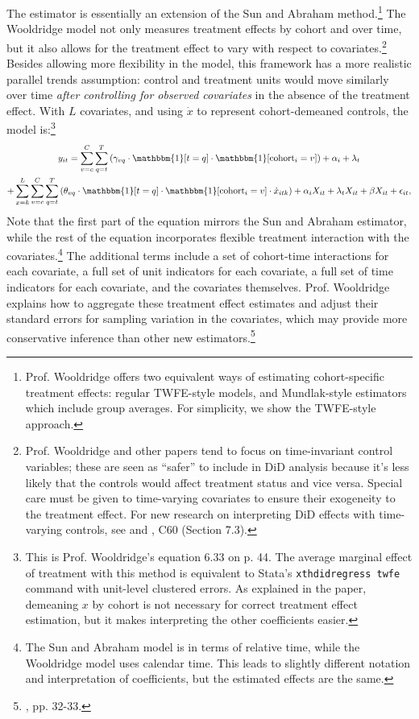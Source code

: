 \documentclass[12pt]{article}
\begin{document}
The \citet{wooldridge2021two} estimator is essentially an extension of the Sun and Abraham method.\footnote{Prof. Wooldridge offers two equivalent ways of estimating cohort-specific treatment effects: regular TWFE-style models, and Mundlak-style estimators which include group averages. For simplicity, we show the TWFE-style approach.}  The Wooldridge model not only measures treatment effects by cohort and over time, but it also allows for the treatment effect to vary with respect to covariates.\footnote{Prof. Wooldridge and other papers tend to focus on time-invariant control variables; these are seen as “safer” to include in DiD analysis because it’s less likely that the controls would affect treatment status and vice versa. Special care must be given to time-varying covariates to ensure their exogeneity to the treatment effect. For new research on interpreting DiD effects with time-varying controls, see \citet{caetano2023} and \citet{wooldridge2023nonlinear}, C60 (Section 7.3).} Besides allowing more flexibility in the model, this framework has a more realistic parallel trends assumption: control and treatment units would move similarly over time \textit{after controlling for observed covariates} in the absence of the treatment effect. With $L$ covariates, and using $\dot{x}$ to represent cohort-demeaned controls, the model is:\footnote{This is Prof. Wooldridge’s equation 6.33 on p. 44. The average marginal effect of treatment with this method is equivalent to Stata’s \texttt{xthdidregress twfe} command with unit-level clustered errors. As explained in the paper, demeaning $x$ by cohort is not necessary for correct treatment effect estimation, but it makes interpreting the other coefficients easier.}
\begin{multline}
    y_{it} = \sum_{v=c}^C\sum_{q=t}^T\left(\gamma_{vq}\cdot\mathbbm{1}[t=q]\cdot \mathbbm{1}[\text{cohort}_i=v]\right) + \alpha_i + \lambda_t \\
    + \sum_{x=k}^L\sum_{v=c}^C\sum_{q=t}^T\left(\theta_{vq}\cdot \mathbbm{1}[t=q]\cdot \mathbbm{1}[\text{cohort}_i=v] \cdot \dot{x}_{itk}\right) + \alpha_i X_{it} + \lambda_t X_{it} + \beta X_{it} +\epsilon_{it},
\end{multline}
Note that the first part of the equation mirrors the Sun and Abraham estimator, while the rest of the equation incorporates flexible treatment interaction with the covariates.\footnote{The Sun and Abraham model is in terms of relative time, while the Wooldridge model uses calendar time. This leads to slightly different notation and interpretation of coefficients, but the estimated effects are the same.}  The additional terms include a set of cohort-time interactions for each covariate, a full set of unit indicators for each covariate, a full set of time indicators for each covariate, and the covariates themselves. Prof. Wooldridge explains how to aggregate these treatment effect estimates and adjust their standard errors for sampling variation in the covariates, which may provide more conservative inference than other new estimators.\footnote{\citet{wooldridge2021two}, pp. 32-33.}
\end{document}
